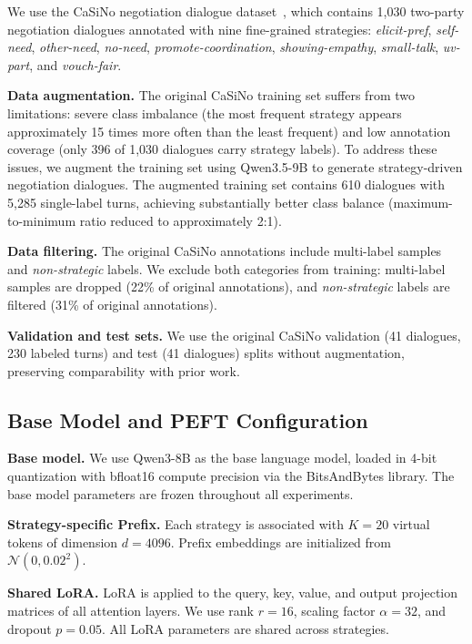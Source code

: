 \documentclass[conference]{IEEEtran}
\begin{document}
We use the CaSiNo negotiation dialogue dataset~\cite{chawla2021casino}, which contains 1,030 two-party negotiation dialogues annotated with nine fine-grained strategies: \textit{elicit-pref}, \textit{self-need}, \textit{other-need}, \textit{no-need}, \textit{promote-coordination}, \textit{showing-empathy}, \textit{small-talk}, \textit{uv-part}, and \textit{vouch-fair}.

\textbf{Data augmentation.} The original CaSiNo training set suffers from two limitations: severe class imbalance (the most frequent strategy appears approximately 15 times more often than the least frequent) and low annotation coverage (only 396 of 1,030 dialogues carry strategy labels). To address these issues, we augment the training set using Qwen3.5-9B to generate strategy-driven negotiation dialogues. The augmented training set contains 610 dialogues with 5,285 single-label turns, achieving substantially better class balance (maximum-to-minimum ratio reduced to approximately 2:1).

\textbf{Data filtering.} The original CaSiNo annotations include multi-label samples and \textit{non-strategic} labels. We exclude both categories from training: multi-label samples are dropped (22\% of original annotations), and \textit{non-strategic} labels are filtered (31\% of original annotations).

\textbf{Validation and test sets.} We use the original CaSiNo validation (41 dialogues, 230 labeled turns) and test (41 dialogues) splits without augmentation, preserving comparability with prior work.

\subsection{Base Model and PEFT Configuration}

\textbf{Base model.} We use Qwen3-8B as the base language model, loaded in 4-bit quantization with bfloat16 compute precision via the BitsAndBytes library. The base model parameters are frozen throughout all experiments.

\textbf{Strategy-specific Prefix.} Each strategy is associated with $K = 20$ virtual tokens of dimension $d = 4096$. Prefix embeddings are initialized from $\mathcal{N}(0, 0.02^2)$.

\textbf{Shared LoRA.} LoRA is applied to the query, key, value, and output projection matrices of all attention layers. We use rank $r = 16$, scaling factor $\alpha = 32$, and dropout $p = 0.05$. All LoRA parameters are shared across strategies.
\end{document}
